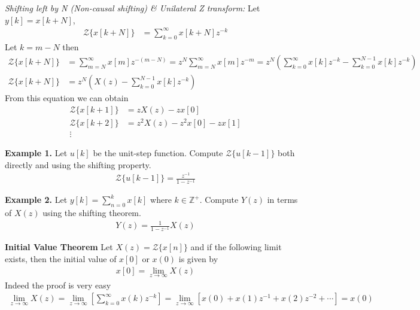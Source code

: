 \documentclass[twoside]{article}
\begin{document}
\textit{Shifting left by N (Non-causal shifting) \& Unilateral Z
  transform:}  Let $y[k] = x[k + N]$,
%
\begin{align*}
\mathcal{Z} \lbrace x[k+N]\rbrace &= \sum\limits_{k=0}^{\infty}
  x[k + N] z^{-k} 
\end{align*}
%
Let $k = m - N$ then 
%
\begin{align*}
\mathcal{Z} \lbrace x[k+N]\rbrace &= \sum\limits_{m=N}^{\infty}
  x[m] z^{-(m-N)} = z^N \sum\limits_{m=N}^{\infty}
  x[m] z^{-m} = z^N \left( \sum\limits_{k=0}^{\infty}
  x[k] z^{-k} - \sum\limits_{k=0}^{N-1} x[k] z^{-k} \right)
\\ 
\mathcal{Z} \lbrace x[k+N]\rbrace &= z^N \left( X(z) -
                                    \sum\limits_{k=0}^{N-1} x[k]
                                    z^{-k} \right)
\end{align*}
%
From this equation we can obtain
\begin{align*}
\mathcal{Z} \lbrace x[k+1]\rbrace &= z X(z) - z x[0]
\\
\mathcal{Z} \lbrace x[k+2]\rbrace &= z^2 X(z) - z^2 x[0] - z x[1]
\\
\vdots &
\end{align*}

\textbf{Example 1.} Let $u[k]$ be the unit-step function. Compute
$\mathcal{Z} \lbrace u[k-1] \rbrace$ both directly and using the shifting property.
%
\begin{align*}
  \mathcal{Z} \lbrace u[k-1] \rbrace = \frac{z^{-1}}{1 - z^{-1}}
\end{align*}
%


\textbf{Example 2.} Let $y[k] = \sum\limits_{n=0}^{k} x[k]$ where $k
\in \mathbb{Z}^+$. Compute $Y(z)$ in terms of $X(z)$ using the
shifting theorem.
%
\begin{align*}
 Y(z) = \frac{1}{1 - z^{-1}} X(z)
\end{align*}
%

\textbf{Initial Value Theorem}
%
Let $X(z) = \mathcal{Z} \lbrace x[n] \rbrace$ and if the following limit exists, 
then the initial value of $x[0]$ or $x(0)$ is given by
%
\begin{align*}
x[0] = \lim_{z \to \infty} X(z)
\end{align*}
%
Indeed the proof is very easy
%
\begin{align*}
\lim_{z \to \infty} X(z) = \lim_{z \to \infty} \left[
  \sum\limits_{k=0}^{\infty} x(k) z^{-k} \right] = \lim_{z \to \infty} \left[ x(0) + x(1) z^{-1} +
  x(2) z^{-2} + \cdots \right]
 = x(0)
\end{align*}
%
\end{document}
